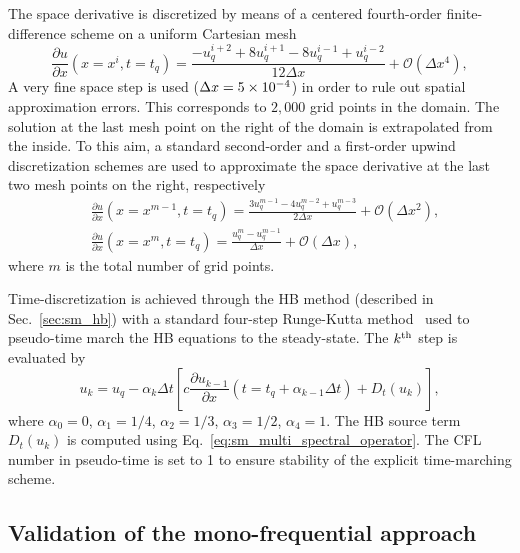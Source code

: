 The space derivative is discretized by means of a centered 
fourth-order finite-difference scheme on a uniform Cartesian mesh
\begin{equation}
    \frac{\partial u}{\partial x} (x = x^i, t=t_q) =
    \frac{-u^{i+2}_{q} + 8 u^{i+1}_{q} - 8 u^{i-1}_{q} + u^{i-2}_{q}}{12\Delta x}
    + \mathcal{O} (\Delta x^4),
    \label{eq:convection_center4}
\end{equation}
A very fine space step is used ($\Delta x=5\e{-4}$) in order to rule 
out spatial approximation errors. This corresponds to $2,000$ grid points
in the domain. 
The solution at the last mesh 
point on the right of the domain is extrapolated 
from the inside. To this aim, a standard second-order 
and a first-order upwind discretization schemes
are used to approximate the space derivative at 
the last two mesh points on the right, respectively
\begin{equation}
    \begin{split}
        &\frac{\partial u}{\partial x} (x = x^{m-1}, t=t_q) =
            \frac{3 u^{m-1}_{q} - 4 u^{m-2}_{q} + u^{m-3}_{q}}{2\Delta x} + \mathcal{O} (\Delta x^2), \\
        &\frac{\partial u}{\partial x} (x = x^m, t=t_q) = 
            \frac{u^{m}_{q} - u^{m-1}_{q}}{\Delta x} + \mathcal{O} (\Delta x),
    \end{split}
\label{eq:upwind_scheme}
\end{equation}
where $m$ is the total number of grid points.

Time-discretization is achieved 
through the HB method (described in Sec.~\ref{sec:sm_hb})
with a standard four-step Runge-Kutta method~\cite{Jameson1981}
used to pseudo-time 
march the HB equations to the steady-state.
The $k\textsuperscript{th}$ step is evaluated by
\begin{equation}
    u_k = u_q - \alpha_k \Delta t \left [ 
          c \frac{\partial u_{k-1}}{\partial x} (t=t_q + \alpha_{k-1} \Delta t)
          + D_t(u_k)
          \right],
    \label{eq:convection_rk4}
\end{equation}
where $\alpha_0 = 0$, $\alpha_1 = 1/4$, 
$\alpha_2 = 1/3$, $\alpha_3 = 1/2$, $\alpha_4 = 1$. 
The HB source term $D_t(u_k)$ is computed using Eq.~\eqref{eq:sm_multi_spectral_operator}.
The CFL number in pseudo-time is set to 1 
to ensure stability of the explicit time-marching scheme.

\subsection{Validation of the mono-frequential approach}
\label{sec:sum_sine}

